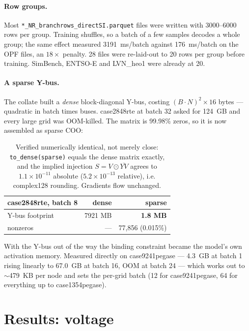 \documentclass[10pt]{article}
\begin{document}
\paragraph{Row groups.} Most \texttt{*\_NR\_branchrows\_directSI.parquet} files
were written with 3000--6000 rows per group. Training shuffles, so a batch of a
few samples decodes a whole group; the same effect measured 3191~ms/batch
against 176~ms/batch on the OPF files, an $18\times$ penalty. 28 files were
re-laid-out to 20 rows per group before training. SimBench, ENTSO-E and
LVN\_heo1 were already at 20.

\paragraph{A sparse Y-bus.} The collate built a \emph{dense} block-diagonal
Y-bus, costing $(B\!\cdot\!N)^2\times16$ bytes --- quadratic in batch times
buses. case2848rte at batch 32 asked for 124~GB and every large grid was
OOM-killed. The matrix is 99.98\% zeros, so it is now assembled as sparse COO:

\begin{table}[H]
\centering
\small
\begin{tabular}{lrr}
\toprule
case2848rte, batch 8 & dense & sparse \\
\midrule
Y-bus footprint & 7921 MB & \textbf{1.8 MB} \\
nonzeros & --- & 77{,}856 (0.015\%) \\
\bottomrule
\end{tabular}
\caption{Verified numerically identical, not merely close:
\texttt{to\_dense(sparse)} equals the dense matrix exactly, and the implied
injection $S = V\odot\overline{YV}$ agrees to $1.1\times10^{-11}$ absolute
($5.2\times10^{-13}$ relative), i.e. complex128 rounding. Gradients flow
unchanged.}
\end{table}

With the Y-bus out of the way the binding constraint became the model's own
activation memory. Measured directly on case9241pegase --- 4.3~GB at batch 1
rising linearly to 67.0~GB at batch 16, OOM at batch 24 --- which works out to
$\sim$479~KB per node and sets the per-grid batch (12 for case9241pegase, 64 for
everything up to case1354pegase).

\section{Results: voltage}
\end{document}
